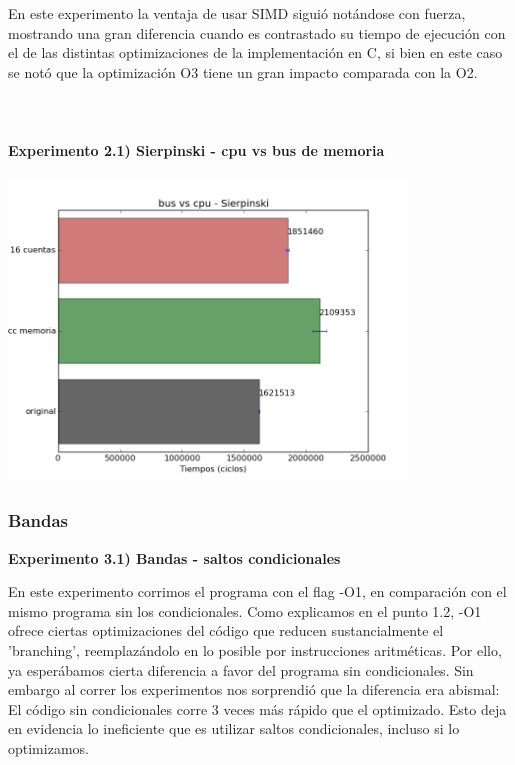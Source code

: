 \documentclass[a4paper]{article}
\begin{document}
En este experimento la ventaja de usar SIMD sigui\'{o} not\'{a}ndose con fuerza, mostrando una gran diferencia cuando es contrastado su tiempo de ejecuci\'{o}n con el de las distintas optimizaciones de la implementaci\'{o}n en C, si bien en este caso se not\'{o} que la optimizaci\'{o}n O3 tiene un gran impacto comparada con la O2. \\ \\ \\ \\

\textbf{Experimento 2.1) Sierpinski - cpu vs bus de memoria}\\ \\

\includegraphics[width=300pt]{imagenes/bvmsierp.png}

\newpage

\subsubsection{Bandas}

\textbf{Experimento 3.1) Bandas - saltos condicionales}

En este experimento corrimos el programa con el flag -O1, en comparaci\'{o}n con el mismo programa sin los condicionales. Como explicamos en el punto 1.2, -O1 ofrece ciertas optimizaciones del c\'{o}digo que reducen sustancialmente el 'branching', reemplaz\'{a}ndolo en lo posible por instrucciones aritm\'{e}ticas. Por ello, ya esper\'{a}bamos cierta diferencia a favor del programa sin condicionales. Sin embargo al correr los experimentos nos sorprendi\'{o} que la diferencia era abismal: El c\'{o}digo sin condicionales corre 3 veces m\'{a}s r\'{a}pido que el optimizado. Esto deja en evidencia lo ineficiente que es utilizar saltos condicionales, incluso si lo optimizamos.
\end{document}
